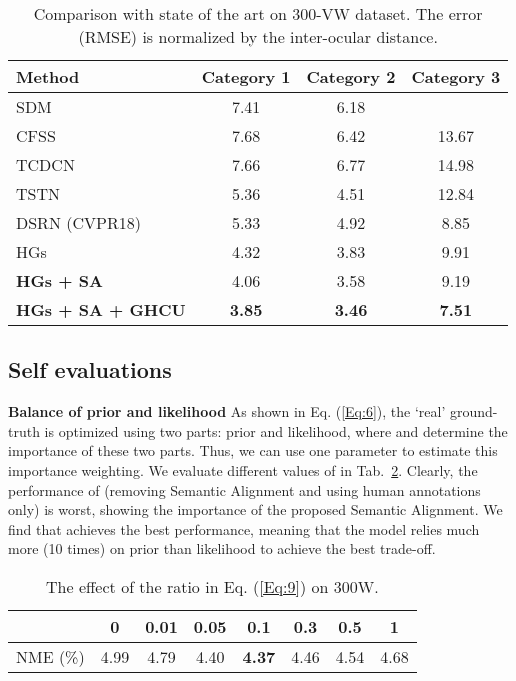 \documentclass[10pt,twocolumn,letterpaper]{article}
\begin{document}
{{{			
			\begin{table}[!thp]
				\centering
\caption{Comparison with state of the art on 300-VW dataset. The error (RMSE) is normalized by the inter-ocular distance.}
				\vspace{3pt}
				\footnotesize
				\label{table_300vw}
				\begin{tabular}{l|ccc}
					\hline
					Method   & Category 1 & Category 2 & Category 3 \\
					\hline
					SDM~\cite{Xiong2013Supervised}   & 7.41 & 6.18  \\
					CFSS~\cite{zhu2015face}   & 7.68 & 6.42 & 13.67 \\
					TCDCN~\cite{zhang2016learning}   & 7.66 & 6.77 & 14.98 \\
					TSTN~\cite{liu2017two}   & 5.36 & 4.51 & 12.84 \\
					DSRN (CVPR18)~\cite{miao2018direct} & 5.33 & 4.92 & 8.85 \\
					\hline
					HGs & 4.32 & 3.83 & 9.91 \\
					\textbf{HGs + SA} & 4.06 & 3.58 & 9.19 \\
					\textbf{HGs + SA + GHCU} & \textbf{3.85} & \textbf{3.46} & \textbf{7.51} \\
					\hline
\end{tabular}
			\end{table}
			
			
			
			\subsection{Self evaluations}
			
			\textbf{Balance of prior and likelihood} 
As shown in Eq. (\ref{Eq:6}), the `real' ground-truth is optimized using two parts:
			prior and likelihood, where   and  determine the importance of these two 
			parts. Thus, we can use one parameter  to estimate this importance weighting.
			We evaluate different values of  in Tab.~\ref{table_sigma}. 
			Clearly, the performance of  (removing Semantic Alignment and  using human annotations only) is worst, showing the importance of the proposed Semantic Alignment.
We find that  achieves the best performance, meaning that the model relies much more (10 times) on prior than likelihood to achieve the best trade-off. 


			
			
			\begin{table}[!thp]
				\centering
\caption{The effect of the ratio    in Eq. (\ref{Eq:9}) on 300W.}
				\vspace{3pt}
				\footnotesize
				\label{table_sigma}
				\begin{tabular}{l|ccccccc}
					\hline
					   & 0 & 0.01 & 0.05 & 0.1 & 0.3 & 0.5 & 1 \\
					\hline
					NME (\%) & 4.99 & 4.79 & 4.40 & \textbf{4.37} & 4.46 & 4.54 & 4.68 \\
					\hline
\end{tabular}
			\end{table}
			
}}}
\end{document}

